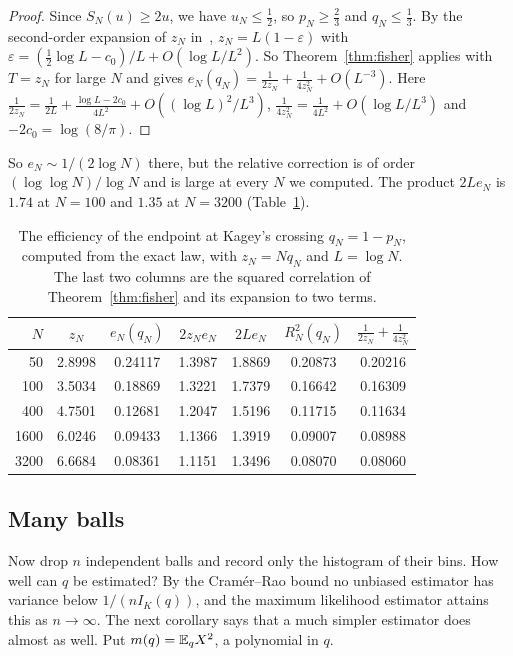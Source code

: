 \begin{proof}
Since $S_N(u)\ge2u$, we have $u_N\le\frac12$, so $p_N\ge\frac23$ and
$q_N\le\frac13$. By the second-order expansion of $z_N$ in~\cite{paperA},
$z_N=L(1-\varepsilon)$ with
$\varepsilon=(\frac12\log L-c_0)/L+O(\log L/L^2)$. So Theorem~\ref{thm:fisher}
applies with $T=z_N$ for large $N$ and gives
$e_N(q_N)=\frac1{2z_N}+\frac1{4z_N^2}+O(L^{-3})$. Here
$\frac1{2z_N}=\frac1{2L}+\frac{\log L-2c_0}{4L^2}+O((\log L)^2/L^3)$,
$\frac1{4z_N^2}=\frac1{4L^2}+O(\log L/L^3)$ and $-2c_0=\log(8/\pi)$.
\end{proof}

So $e_N\sim1/(2\log N)$ there, but the relative correction is of order
$(\log\log N)/\log N$ and is large at every $N$ we computed. The product
$2Le_N$ is $1.74$ at $N=100$ and $1.35$ at $N=3200$ (Table~\ref{tab:fisher}).

\begin{table}[ht]
\centering\small
\begin{tabular}{@{}rcccccc@{}}
\toprule
$N$ & $z_N$ & $e_N(q_N)$ & $2z_Ne_N$ & $2Le_N$ & $R^2_N(q_N)$
 & $\frac1{2z_N}+\frac1{4z_N^2}$\\
\midrule
50 & 2.8998 & 0.24117 & 1.3987 & 1.8869 & 0.20873 & 0.20216\\
100 & 3.5034 & 0.18869 & 1.3221 & 1.7379 & 0.16642 & 0.16309\\
400 & 4.7501 & 0.12681 & 1.2047 & 1.5196 & 0.11715 & 0.11634\\
1600 & 6.0246 & 0.09433 & 1.1366 & 1.3919 & 0.09007 & 0.08988\\
3200 & 6.6684 & 0.08361 & 1.1151 & 1.3496 & 0.08070 & 0.08060\\
\bottomrule
\end{tabular}
\caption{The efficiency of the endpoint at Kagey's crossing $q_N=1-p_N$,
computed from the exact law, with $z_N=Nq_N$ and $L=\log N$. The last two
columns are the squared correlation of Theorem~\ref{thm:fisher} and its
expansion to two terms.}
\label{tab:fisher}
\end{table}\subsection*{Many balls}

Now drop $n$ independent balls and record only the histogram of their bins.
How well can $q$ be estimated? By the Cram\'er--Rao bound no unbiased
estimator has variance below $1/(nI_K(q))$, and the maximum likelihood
estimator attains this as $n\to\infty$. The next corollary says that a much
simpler estimator does almost as well. Put $m(q)=\mathbb E_qX^2$, a polynomial in
$q$.

